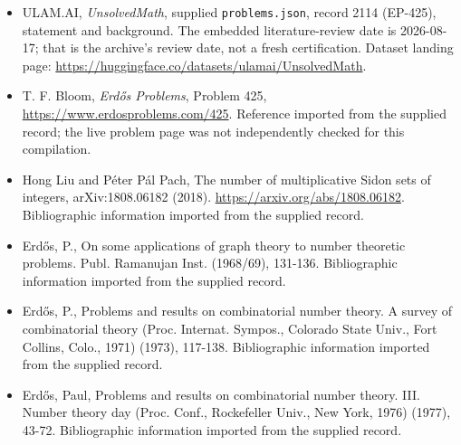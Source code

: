 \documentclass[11pt,a4paper]{article}
\begin{document}
{\small

\begin{itemize}

\item[\hypertarget{source:2114:1}{S1}] ULAM.AI, \emph{UnsolvedMath}, supplied \texttt{problems.json}, record 2114 (EP-425), statement and background. The embedded literature-review date is 2026-08-17; that is the archive’s review date, not a fresh certification. Dataset landing page: \url{https://huggingface.co/datasets/ulamai/UnsolvedMath}.

\item[\hypertarget{source:2114:2}{S2}] T. F. Bloom, \emph{Erdős Problems}, Problem 425, \url{https://www.erdosproblems.com/425}. Reference imported from the supplied record; the live problem page was not independently checked for this compilation.

\item[\hypertarget{source:2114:3}{S3}] Hong Liu and Péter Pál Pach, The number of multiplicative Sidon sets of integers, arXiv:1808.06182 (2018). \url{https://arxiv.org/abs/1808.06182}. Bibliographic information imported from the supplied record.

\item[\hypertarget{source:2114:4}{S4}] Erd\H{o}s, P., On some applications of graph theory to number theoretic problems. Publ. Ramanujan Inst. (1968/69), 131-136. Bibliographic information imported from the supplied record.

\item[\hypertarget{source:2114:5}{S5}] Erd\H{o}s, P., Problems and results on combinatorial number theory. A survey of combinatorial theory (Proc. Internat. Sympos., Colorado State Univ., Fort Collins, Colo., 1971) (1973), 117-138. Bibliographic information imported from the supplied record.

\item[\hypertarget{source:2114:6}{S6}] Erd\H{o}s, Paul, Problems and results on combinatorial number theory. III. Number theory day (Proc. Conf., Rockefeller Univ., New York, 1976) (1977), 43-72. Bibliographic information imported from the supplied record.

\end{itemize}

}

\label{end:2114}
\end{document}
